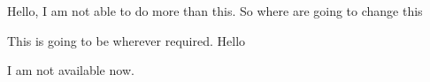 \documentclass{article}
\begin{document}
Hello, I am not able to do more than this. So where are going to change this

This is going to be wherever required. Hello

I am not available now.
\end{document}
